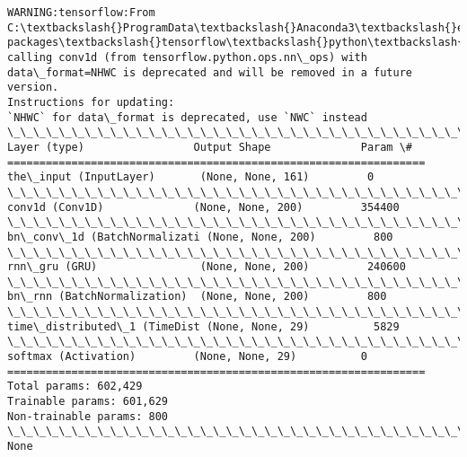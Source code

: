 \documentclass[11pt]{article}
\begin{document}
    \begin{Verbatim}[commandchars=\\\{\}]
WARNING:tensorflow:From C:\textbackslash{}ProgramData\textbackslash{}Anaconda3\textbackslash{}envs\textbackslash{}nbkeras\textbackslash{}lib\textbackslash{}site-packages\textbackslash{}tensorflow\textbackslash{}python\textbackslash{}util\textbackslash{}deprecation.py:497: calling conv1d (from tensorflow.python.ops.nn\_ops) with data\_format=NHWC is deprecated and will be removed in a future version.
Instructions for updating:
`NHWC` for data\_format is deprecated, use `NWC` instead
\_\_\_\_\_\_\_\_\_\_\_\_\_\_\_\_\_\_\_\_\_\_\_\_\_\_\_\_\_\_\_\_\_\_\_\_\_\_\_\_\_\_\_\_\_\_\_\_\_\_\_\_\_\_\_\_\_\_\_\_\_\_\_\_\_
Layer (type)                 Output Shape              Param \#   
=================================================================
the\_input (InputLayer)       (None, None, 161)         0         
\_\_\_\_\_\_\_\_\_\_\_\_\_\_\_\_\_\_\_\_\_\_\_\_\_\_\_\_\_\_\_\_\_\_\_\_\_\_\_\_\_\_\_\_\_\_\_\_\_\_\_\_\_\_\_\_\_\_\_\_\_\_\_\_\_
conv1d (Conv1D)              (None, None, 200)         354400    
\_\_\_\_\_\_\_\_\_\_\_\_\_\_\_\_\_\_\_\_\_\_\_\_\_\_\_\_\_\_\_\_\_\_\_\_\_\_\_\_\_\_\_\_\_\_\_\_\_\_\_\_\_\_\_\_\_\_\_\_\_\_\_\_\_
bn\_conv\_1d (BatchNormalizati (None, None, 200)         800       
\_\_\_\_\_\_\_\_\_\_\_\_\_\_\_\_\_\_\_\_\_\_\_\_\_\_\_\_\_\_\_\_\_\_\_\_\_\_\_\_\_\_\_\_\_\_\_\_\_\_\_\_\_\_\_\_\_\_\_\_\_\_\_\_\_
rnn\_gru (GRU)                (None, None, 200)         240600    
\_\_\_\_\_\_\_\_\_\_\_\_\_\_\_\_\_\_\_\_\_\_\_\_\_\_\_\_\_\_\_\_\_\_\_\_\_\_\_\_\_\_\_\_\_\_\_\_\_\_\_\_\_\_\_\_\_\_\_\_\_\_\_\_\_
bn\_rnn (BatchNormalization)  (None, None, 200)         800       
\_\_\_\_\_\_\_\_\_\_\_\_\_\_\_\_\_\_\_\_\_\_\_\_\_\_\_\_\_\_\_\_\_\_\_\_\_\_\_\_\_\_\_\_\_\_\_\_\_\_\_\_\_\_\_\_\_\_\_\_\_\_\_\_\_
time\_distributed\_1 (TimeDist (None, None, 29)          5829      
\_\_\_\_\_\_\_\_\_\_\_\_\_\_\_\_\_\_\_\_\_\_\_\_\_\_\_\_\_\_\_\_\_\_\_\_\_\_\_\_\_\_\_\_\_\_\_\_\_\_\_\_\_\_\_\_\_\_\_\_\_\_\_\_\_
softmax (Activation)         (None, None, 29)          0         
=================================================================
Total params: 602,429
Trainable params: 601,629
Non-trainable params: 800
\_\_\_\_\_\_\_\_\_\_\_\_\_\_\_\_\_\_\_\_\_\_\_\_\_\_\_\_\_\_\_\_\_\_\_\_\_\_\_\_\_\_\_\_\_\_\_\_\_\_\_\_\_\_\_\_\_\_\_\_\_\_\_\_\_
None

    \end{Verbatim}
\end{document}
